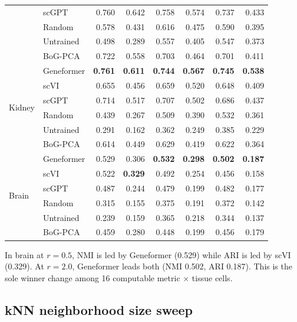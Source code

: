 \documentclass[11pt]{article}
\begin{document}
\begin{table}[h!]
\begin{tabular}{@{}ll rr rr rr@{}}
 & scGPT      & 0.760 & 0.642 & 0.758 & 0.574 & 0.737 & 0.433 \\
 & Random     & 0.578 & 0.431 & 0.616 & 0.475 & 0.590 & 0.395 \\
 & Untrained  & 0.498 & 0.289 & 0.557 & 0.405 & 0.547 & 0.373 \\
 & BoG-PCA    & 0.722 & 0.558 & 0.703 & 0.464 & 0.701 & 0.411 \\
\midrule
\multirow{6}{*}{Kidney}
 & Geneformer & \textbf{0.761} & \textbf{0.611} & \textbf{0.744} & \textbf{0.567} & \textbf{0.745} & \textbf{0.538} \\
 & scVI       & 0.655 & 0.456 & 0.659 & 0.520 & 0.648 & 0.409 \\
 & scGPT      & 0.714 & 0.517 & 0.707 & 0.502 & 0.686 & 0.437 \\
 & Random     & 0.439 & 0.267 & 0.509 & 0.390 & 0.532 & 0.361 \\
 & Untrained  & 0.291 & 0.162 & 0.362 & 0.249 & 0.385 & 0.229 \\
 & BoG-PCA    & 0.614 & 0.449 & 0.629 & 0.419 & 0.622 & 0.364 \\
\midrule
\multirow{6}{*}{Brain}
 & Geneformer & 0.529 & 0.306 & \textbf{0.532} & \textbf{0.298} & \textbf{0.502} & \textbf{0.187} \\
 & scVI       & 0.522 & \textbf{0.329} & 0.492 & 0.254 & 0.456 & 0.158 \\
 & scGPT      & 0.487 & 0.244 & 0.479 & 0.199 & 0.482 & 0.177 \\
 & Random     & 0.315 & 0.155 & 0.375 & 0.191 & 0.372 & 0.142 \\
 & Untrained  & 0.239 & 0.159 & 0.365 & 0.218 & 0.344 & 0.137 \\
 & BoG-PCA    & 0.459 & 0.280 & 0.448 & 0.199 & 0.456 & 0.179 \\
\bottomrule
\end{tabular}
\end{table}

In brain at $r = 0.5$, NMI is led by Geneformer (0.529) while ARI is led by scVI (0.329). At $r = 2.0$, Geneformer leads both (NMI 0.502, ARI 0.187). This is the sole winner change among 16 computable metric $\times$ tissue cells.

\subsection{kNN neighborhood size sweep}
\end{document}
